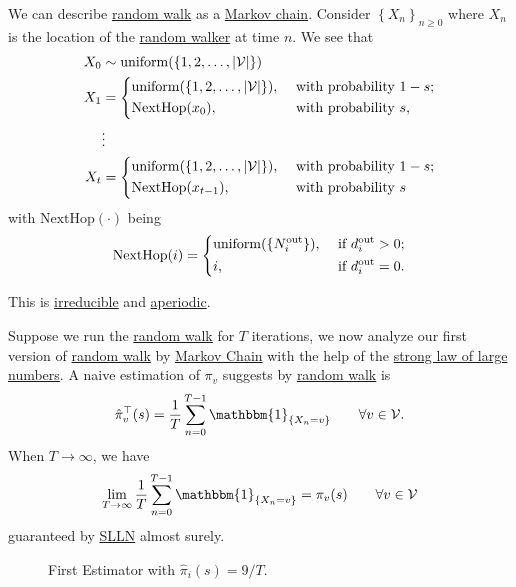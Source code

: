 We can describe \hyperref[algo:random-walk-algorithm]{random walk} as a \hyperref[def:Markov-chain]{Markov chain}. Consider
\(\left\{ X_n \right\}_{n\geq 0}\) where \(X_n\) is the location of the \hyperref[def:random-walker]{random walker} at time \(n\). We see that
\[
	\begin{split}
		X_0 &\sim \mathrm{uniform}(\{1, 2, \ldots , \left\vert \mathcal{\MakeUppercase{V}} \right\vert\})\\
		X_1 &=\begin{dcases}
			\mathrm{uniform}(\{1, 2, \ldots , \left\vert \mathcal{\MakeUppercase{V}} \right\vert \}), & \text{ with probability }1 - s; \\
			\mathrm{NextHop}(x_0),                                                                    & \text{ with probability }s,     \\
		\end{dcases}\\
		&\vdots\\
		X_t &=\begin{dcases}
			\mathrm{uniform}(\{1, 2, \ldots , \left\vert \mathcal{\MakeUppercase{V}} \right\vert\}), & \text{ with probability }1 - s; \\
			\mathrm{NextHop}(x_{t-1}),                                                               & \text{ with probability }s      \\
		\end{dcases}
	\end{split}
\]
with \(\mathrm{NextHop}(\cdot)\) being
\[
	\mathrm{NextHop}(i)=\begin{dcases}
		\mathrm{uniform}(\{N^{\text{out}}_i\}), & \text{ if }d^{\text{out}}_i > 0; \\
		i,                                      & \text{ if }d^{\text{out}}_i = 0.
	\end{dcases}
\]
\begin{note}
	This is \hyperref[def:irreducible]{irreducible} and \hyperref[def:aperiodic]{aperiodic}.
\end{note}

Suppose we run the \hyperref[algo:random-walk-algorithm]{random walk} for \(T\) iterations, we now analyze our first version of
\hyperref[algo:random-walk-algorithm]{random walk} by \hyperref[def:Markov-chain]{Markov Chain} with the help of
the \hyperref[thm:SLLN]{strong law of large numbers}. A naive estimation of \(\pi_v \) suggests by \hyperref[algo:random-walk-algorithm]{random walk}
is
\[
	\hat{\pi}^{\top}_{v}(s)
	= \frac{1}{T}\sum\limits_{n=0}^{T-1} \mathbbm{1}_{\{X_n = v\}}\qquad \forall v\in \mathcal{V}.
\]
When \(T\to \infty \), we have
\[
	\lim_{T\to \infty}\frac{1}{T} \sum\limits_{n=0}^{T-1} \mathbbm{1}_{\{X_n = v\}} = \pi_v(s) \qquad \forall v\in \mathcal{V}
\]
guaranteed by \hyperref[thm:SLLN]{SLLN} almost surely.
\begin{figure}[H]
	\centering
	\caption{First Estimator with \(\hat{\pi}_i(s) = 9/T\).}
	\label{fig:Monte-Carlo-Estimator-1}
\end{figure}

